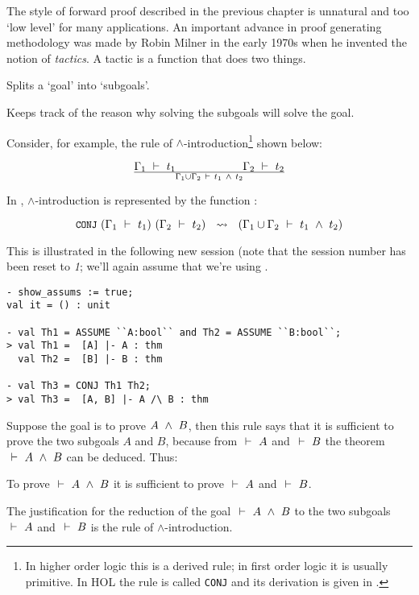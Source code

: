 The style of forward proof described in the previous chapter is
unnatural and too `low level' for many applications. An important
advance in proof generating methodology was made by Robin Milner in
the early 1970s when he invented the notion of {\it tactics\/}. A
tactic is a function that does two things.
\begin{myenumerate}
\item Splits a `goal' into `subgoals'.
\item Keeps track of the reason why solving the subgoals will solve the goal.
\end{myenumerate}

\noindent Consider, for example, the  rule of $\wedge$-introduction\footnote{In
  higher order logic this is a derived rule; in first order logic it
  is usually primitive.  In HOL the rule is called {\tt CONJ} and its
  derivation is given in \DESCRIPTION.}  shown below:

\[ \Gamma_1\ \vdash\ 
t_1\qquad\qquad\qquad\Gamma_2\ \vdash\  t_2\over \Gamma_1\cup\Gamma_2 \ \vdash\  t_1\ \wedge\ 
t_2 \]


\noindent In \HOL,  $\wedge$-introduction is  represented by  the \ML{} function
:

\[\ml{CONJ}\ (\Gamma_1\turn t_1)\ (\Gamma_2\turn t_2) \ \ \leadsto\
\ (\Gamma_1\cup\Gamma_2\turn  t_1\conj  t_2)\]

\noindent  This  is   illustrated  in  the
following new session (note that the session number has been reset to
{\small\sl 1}; we'll again assume that we're using \ml{hol.unquote}.

\setcounter{sessioncount}{0}
\begin{session}\begin{verbatim}
- show_assums := true;
val it = () : unit

- val Th1 = ASSUME ``A:bool`` and Th2 = ASSUME ``B:bool``;
> val Th1 =  [A] |- A : thm
  val Th2 =  [B] |- B : thm

- val Th3 = CONJ Th1 Th2;
> val Th3 =  [A, B] |- A /\ B : thm
\end{verbatim}\end{session}

    Suppose the goal is to prove $A\ \wedge\  B$, then this rule says that
    it is sufficient to prove the two subgoals $A$ and $B$, because
    from $\ \vdash\  A$ and $\ \vdash\  B$ the theorem $\ \vdash\  A\ \wedge\  B$ can be
    deduced. Thus:

\begin{myenumerate}
\item To prove $\ \vdash\  A \ \wedge\  B$ it is sufficient to
      prove $\ \vdash\  A$ and $\ \vdash\  B$.
\item The justification for the reduction of the
goal  $\ \vdash\  A \ \wedge\  B$  to the two  subgoals  $\ \vdash\  A$
and $\ \vdash\  B$ is the rule of $\wedge$-introduction.
\end{myenumerate}

